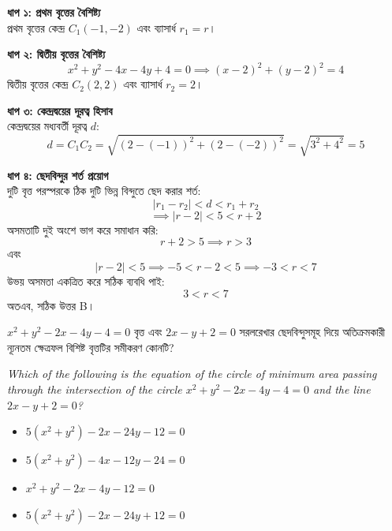 \documentclass[12pt, a4paper]{article}
\begin{document}
\begin{tcolorbox}[solutionbox={সমাধান (Solution)}]
    \noindent
    \textbf{ধাপ ১: প্রথম বৃত্তের বৈশিষ্ট্য} \\
    প্রথম বৃত্তের কেন্দ্র $C_1(-1, -2)$ এবং ব্যাসার্ধ $r_1 = r$।
    
    \vspace{0.5em}
    \noindent\textbf{ধাপ ২: দ্বিতীয় বৃত্তের বৈশিষ্ট্য} \\
    \[ x^2 + y^2 - 4x - 4y + 4 = 0 \implies (x-2)^2 + (y-2)^2 = 4 \]
    দ্বিতীয় বৃত্তের কেন্দ্র $C_2(2, 2)$ এবং ব্যাসার্ধ $r_2 = 2$।
    
    \vspace{0.5em}
    \noindent\textbf{ধাপ ৩: কেন্দ্রদ্বয়ের দূরত্ব হিসাব} \\
    কেন্দ্রদ্বয়ের মধ্যবর্তী দূরত্ব $d$:
    \[ d = C_1C_2 = \sqrt{(2 - (-1))^2 + (2 - (-2))^2} = \sqrt{3^2 + 4^2} = 5 \]
    
    \vspace{0.5em}
    \noindent\textbf{ধাপ ৪: ছেদবিন্দুর শর্ত প্রয়োগ} \\
    দুটি বৃত্ত পরস্পরকে ঠিক দুটি ভিন্ন বিন্দুতে ছেদ করার শর্ত:
    \[ |r_1 - r_2| < d < r_1 + r_2 \]
    \[ \implies |r - 2| < 5 < r + 2 \]
    অসমতাটি দুই অংশে ভাগ করে সমাধান করি:
    \[ r + 2 > 5 \implies r > 3 \]
    এবং
    \[ |r - 2| < 5 \implies -5 < r - 2 < 5 \implies -3 < r < 7 \]
    উভয় অসমতা একত্রিত করে সঠিক ব্যবধি পাই:
    \[ 3 < r < 7 \]
    অতএব, সঠিক উত্তর B।
\end{tcolorbox}
\begin{tcolorbox}[questionbox={প্রশ্ন (Question) 28}]
    \noindent
    $x^2 + y^2 - 2x - 4y - 4 = 0$ বৃত্ত এবং $2x - y + 2 = 0$ সরলরেখার ছেদবিন্দুসমূহ দিয়ে অতিক্রমকারী ন্যূনতম ক্ষেত্রফল বিশিষ্ট বৃত্তটির সমীকরণ কোনটি?
    
    \vspace{0.8em}
    \begin{english}
    \noindent\textit{\color{darkgray}
    Which of the following is the equation of the circle of minimum area passing through the intersection of the circle $x^2 + y^2 - 2x - 4y - 4 = 0$ and the line $2x - y + 2 = 0$?
    }
    \end{english}
\end{tcolorbox}

\vspace{1em}
\begin{itemize}[label={}, leftmargin=1cm, itemsep=0.5em]
    \item[\textbf{A)}] $5(x^2 + y^2) - 2x - 24y - 12 = 0$
    \item[\textbf{B)}] $5(x^2 + y^2) - 4x - 12y - 24 = 0$
    \item[\textbf{C)}] $x^2 + y^2 - 2x - 4y - 12 = 0$
    \item[\textbf{D)}] $5(x^2 + y^2) - 2x - 24y + 12 = 0$
\end{itemize}
\end{document}
